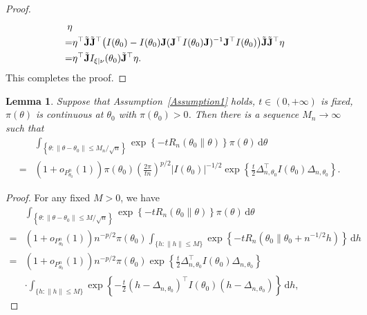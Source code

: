\documentclass[11pt]{article}
\theoremstyle{plain}
\newtheorem{lemma}{\quad\quad Lemma}
\theoremstyle{definition}
\theoremstyle{remark}
\begin{document}
\begin{appendices}
\begin{proof}
\begin{align*}
\eta
\\
=&
\eta^\top 
         \tilde {\mathbf{J}} \tilde {\mathbf{J}}^\top 
             \big(
             I(\theta_0)
            -
            I(\theta_0) \mathbf{J} (\mathbf{J}^\top  I(\theta_0) \mathbf{J})^{-1} \mathbf{J}^\top  I(\theta_0)
        \big)
         \tilde {\mathbf{J}} \tilde {\mathbf{J}}^\top 
\eta
\\
=&
\eta^\top 
         \tilde {\mathbf{J}} 
         I_{\xi | \nu} (\theta_0)
         \tilde {\mathbf{J}}^\top 
         \eta.
\end{align*}
This completes the proof.
    \end{proof}





\begin{lemma}
    Suppose that Assumption~\ref{Assumption1} holds, $t\in (0,+\infty)$ is fixed,  $\pi(\theta)$ is continuous at $\theta_0$ with $\pi(\theta_0)>0$.
        Then there is a sequence $M_n \to \infty$ such that
        \begin{align*}
&
    \int_{\left\{ \theta: \|\theta - \theta_0\| \leq M_n/\sqrt n \right\}}
    \exp\left\{-t R_n(\theta_0\| \theta) \right\} \pi(\theta)
\, \mathrm d \theta
\\
=&
    (1+o_{P^n_{\theta_0}}(1))
    \pi(\theta_0)
    \left(\frac{2\pi}{t n}\right)^{{p}/{2}}
    |I(\theta_0)|^{-{1}/{2}} 
    \exp
    \left\{ 
        \frac{t}{2}\Delta_{n,\theta_0}^\top  I({\theta_0})\Delta_{n,\theta_0}
\right\}
    .
        \end{align*}
    \label{prop:lowerBoud}
\end{lemma}
\begin{proof}
    For any fixed $M>0$, we have
    \begin{align*}
& \int_{\left\{ \theta: \|\theta - \theta_0\| \leq M/\sqrt n \right\}}
\exp \left\{-t R_n(\theta_0\| \theta) \right\} \pi(\theta)
\, \mathrm d \theta
    \\
    =
    &
    (1+o_{P^n_{\theta_0}}(1))
    n^{-p/2} \pi(\theta_0)
    \int_{\{h:\|h\|\leq M\}}\exp\left\{ - t R_n(\theta_0\|\theta_0+n^{-1/2}h)\right\} \, \mathrm d h
    \\
    =&
    (1+o_{P^n_{\theta_0}}(1))
    n^{-p/2}\pi(\theta_0)
    \exp\left\{ 
        \frac{t}{2}\Delta_{n,\theta_0}^\top  I({\theta_0})\Delta_{n,\theta_0}
    \right\}
    \\
    &
    \cdot
    \int_{\{h:\|h\|\leq M\}}\exp\left\{ -\frac{t}{2}(h-\Delta_{n,\theta_0})^\top  I({\theta_0})(h-\Delta_{n,\theta_0})\right\} \, \mathrm dh
,
\end{align*}

\end{proof}
\end{appendices}
\end{document}
